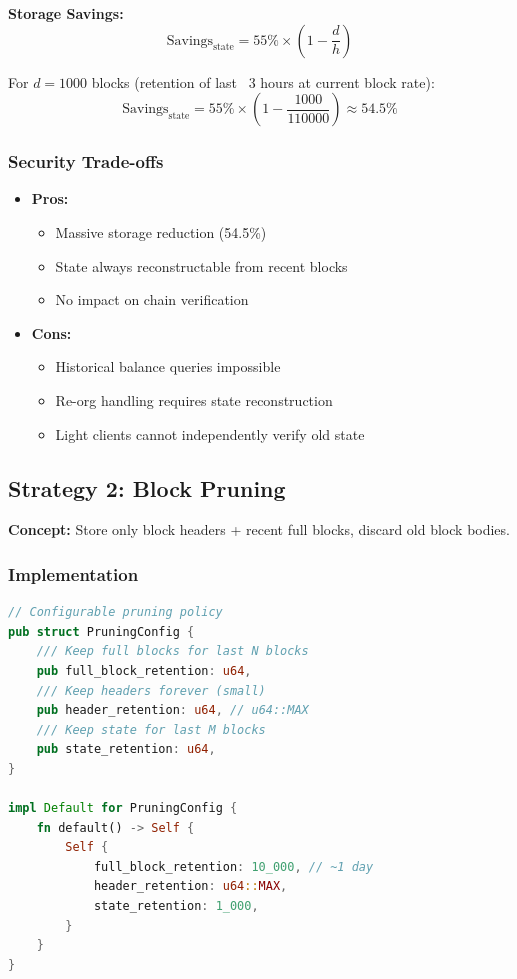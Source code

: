 \documentclass[11pt,a4paper]{article}
\begin{document}
\textbf{Storage Savings:}
\begin{equation}
\text{Savings}_{\text{state}} = 55\% \times \left(1 - \frac{d}{h}\right)
\end{equation}

For $d = 1000$ blocks (retention of last ~3 hours at current block rate):
\begin{equation}
\text{Savings}_{\text{state}} = 55\% \times \left(1 - \frac{1000}{110000}\right) \approx 54.5\%
\end{equation}

\subsubsection{Security Trade-offs}

\begin{itemize}
\item \textbf{Pros:}
    \begin{itemize}
    \item Massive storage reduction (54.5\%)
    \item State always reconstructable from recent blocks
    \item No impact on chain verification
    \end{itemize}
\item \textbf{Cons:}
    \begin{itemize}
    \item Historical balance queries impossible
    \item Re-org handling requires state reconstruction
    \item Light clients cannot independently verify old state
    \end{itemize}
\end{itemize}

\subsection{Strategy 2: Block Pruning}

\textbf{Concept:} Store only block headers + recent full blocks, discard old block bodies.

\subsubsection{Implementation}

\begin{lstlisting}[language=Rust]
// Configurable pruning policy
pub struct PruningConfig {
    /// Keep full blocks for last N blocks
    pub full_block_retention: u64,
    /// Keep headers forever (small)
    pub header_retention: u64, // u64::MAX
    /// Keep state for last M blocks
    pub state_retention: u64,
}

impl Default for PruningConfig {
    fn default() -> Self {
        Self {
            full_block_retention: 10_000, // ~1 day
            header_retention: u64::MAX,
            state_retention: 1_000,
        }
    }
}
\end{lstlisting}
\end{document}
